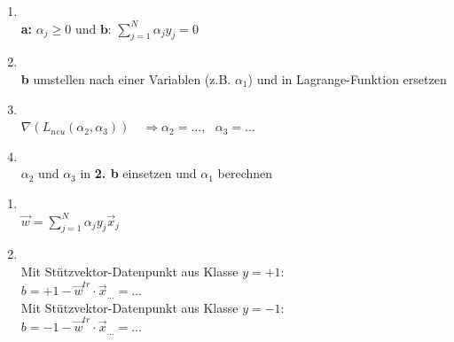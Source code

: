 \begin{enumerate}
    \item {}\\
    \textbf{a: }$\boxed{\alpha_j\geq0} \text{ und } \textbf{b: } \boxed{\sum_{j=1}^N\alpha_jy_j=0} $\\
    \item {}\\
    \textbf{b} umstellen nach einer Variablen (z.B. $\alpha_1$) und in Lagrange-Funktion ersetzen
    \item {}\\
    $\nabla(L_{neu}(\alpha_2 , \alpha_3)) \quad \Rightarrow \alpha_2 = ..., \text{  } \alpha_3 = ...$
    \item {}\\
    $\alpha_2$ und $\alpha_3$ in \textbf{2. b} einsetzen und $\alpha_1$ berechnen\\
\end{enumerate}

\begin{enumerate}
    \item {}\\
    $\boxed{\vec{w}=\sum_{j=1}^N\alpha_jy_j\vec{x}_j}$
    \item {}\\
    Mit Stützvektor-Datenpunkt aus Klasse $y = +1$:\\
    $\boxed{b = +1 -\vec{w}^{tr}\cdot\vec{x}_{...} = ...}$\\
    Mit Stützvektor-Datenpunkt aus Klasse $y = -1$:\\
    $\boxed{b = -1 -\vec{w}^{tr}\cdot\vec{x}_{...} = ...}$\\
\end{enumerate}









